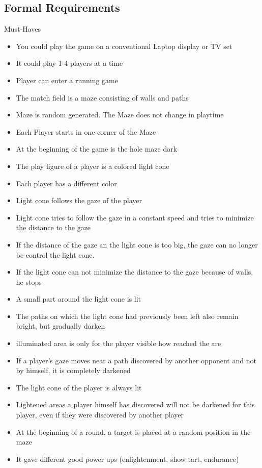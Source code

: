 \documentclass{sigchi}
\begin{document}
\subsection{Formal Requirements}
	Must-Haves
	\begin{itemize}
		\item You could play the game on a conventional Laptop display or TV set
		\item It could play 1-4 players at a time 
		\item Player can enter a running game
		\item The match field is a maze consisting of walls and paths 
		\item Maze is random generated. The Maze does not change in playtime
		\item Each Player starts in one corner of the Maze
		\item At the beginning of the game is the hole maze dark
		\item The play figure of a player is a colored light cone
		\item Each player has a different color
		\item Light cone follows the gaze of the player
		\item Light cone tries to follow the gaze in a constant speed and tries to minimize the distance to the gaze
		\item If the distance of the gaze an the light cone is too big, the gaze can no longer be control the light cone.
		\item 	If the light cone can not minimize the distance to the gaze because of walls, he stops
		\item 	A small part around the light cone is lit
		\item The paths on which the light cone had previously been left also remain bright, but gradually darken
		\item 	illuminated area is only for the player visible how reached the are
		\item If a player's gaze moves near a path discovered by another opponent and not by himself, it is completely darkened 
		\item 	The light cone of the player is always lit
		\item 	Lightened areas a player himself has discovered will not be darkened for this player, even if they were discovered by another player
		\item At the beginning of a round, a target is placed at a random position in the maze
		\item It gave different good power ups (enlightenment, show tart, endurance)
	\end{itemize}
\end{document}
